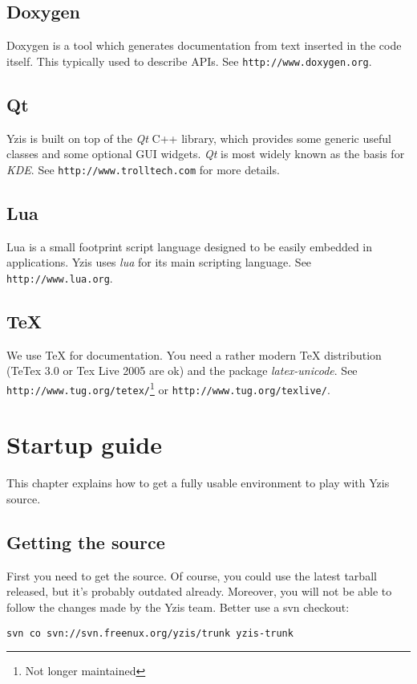 \documentclass[a4paper,12pt]{report}
\begin{document}
\section{Doxygen}
Doxygen is a tool which generates documentation from text inserted in the
code itself. This typically used to describe APIs.
See \texttt{http://www.doxygen.org}.

\section{Qt}
Yzis is built on top of the \emph{Qt} C++ library, which provides some
generic useful classes and some optional GUI widgets. \emph{Qt} is most
widely known as the basis for \emph{KDE}.
See \texttt{http://www.trolltech.com} for more details.

\section{Lua}
Lua is a small footprint script language designed to be easily embedded in
applications. Yzis uses \emph{lua} for its main scripting language. See
\texttt{http://www.lua.org}.

\section{\TeX}
We use {\TeX} for documentation. You need a rather modern {\TeX} distribution
(TeTex 3.0 or Tex Live 2005 are ok) and the package \emph{latex-unicode}.
See \texttt{http://www.tug.org/tetex/}\footnote{Not longer
maintained} or \texttt{http://www.tug.org/texlive/}.

\chapter{Startup guide}
This chapter explains how to get a fully usable environment to play with
Yzis source.

\section{Getting the source}
First you need to get the source. Of course, you could use the latest
tarball released, but it's probably outdated already. Moreover, you will
not be able to follow the changes made by the Yzis team.
Better use a svn checkout:

\begin{verbatim}
svn co svn://svn.freenux.org/yzis/trunk yzis-trunk
\end{verbatim}
\end{document}
